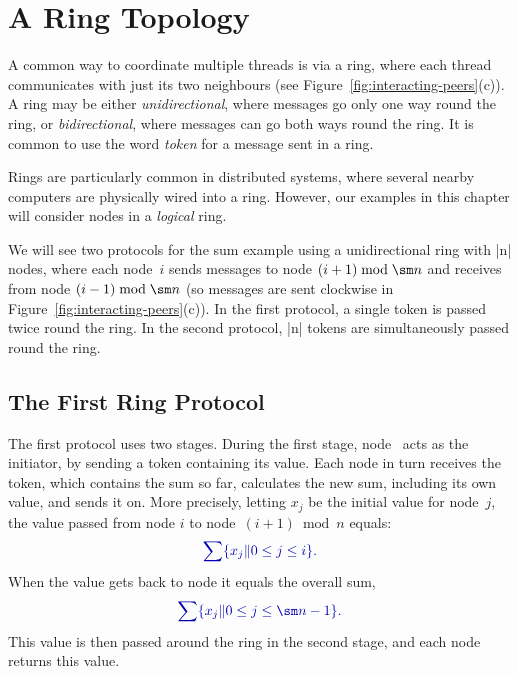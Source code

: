\section{A Ring Topology}

A common way to coordinate multiple threads is via a ring, where each thread
communicates with just its two neighbours (see
Figure~\ref{fig:interacting-peers}(c)).  A ring may be either
\emph{unidirectional}, where messages go only one way round the ring, or
\emph{bidirectional}, where messages can go both ways round the ring.  It is
common to use the word \emph{token} for a message sent in a ring.

Rings are particularly common in distributed systems, where several nearby
computers are physically wired into a ring.  However, our examples in this
chapter will consider nodes in a \emph{logical} ring.  

We will see two protocols for the sum example using a unidirectional ring with
|n| nodes, where each node~$i$ sends messages to node $(i+1) \bmod \sm n$ and
receives from node $(i-1) \bmod \sm n$ (so messages are sent clockwise in
Figure~\ref{fig:interacting-peers}(c)).  In the first protocol, a single token
is passed twice round the ring.  In the second protocol, |n| tokens are
simultaneously passed round the ring.


\subsection{The First Ring Protocol}

The first protocol uses two stages.  During the first stage, node~
acts as the initiator, by sending a token containing its value.  Each node in
turn receives the token, which contains the sum so far, calculates the new
sum, including its own value, and sends it on.  More precisely, letting $x_j$
be the initial value for node~$j$, the value passed from node $i$ to
node~$(i+1) \bmod n$ equals:
%
\[\mstyle
\sum \set{x_j \| 0 \le j \le i}.
\]
When the value gets back to node  it equals the overall sum, 
\[\mstyle
\sum \set{x_j \| 0 \le j \le \sm n-1}.
\]
This value is then passed around the ring in the second stage, and each node
returns this value.


